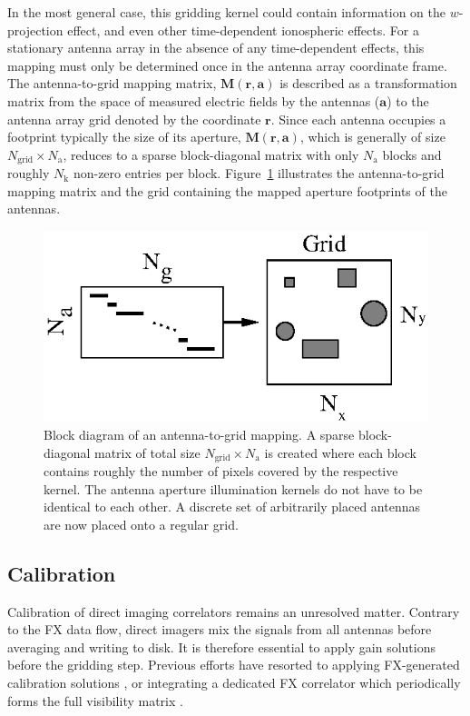 \documentclass[a4paper,fleqn,usenatbib]{../mnras}
\begin{document}
In the most general case, this gridding kernel could contain information on the
$w$-projection effect, and even other time-dependent ionospheric effects. For a
stationary antenna array in the absence of any time-dependent effects, this
mapping must only be determined once in the antenna array coordinate frame. The
antenna-to-grid mapping matrix, $\mathbf{M}(\mathbf{r},\mathbf{a})$ is described
as a transformation matrix from the space of measured electric fields by the antennas
($\mathbf{a}$) to the antenna array grid denoted by the coordinate $\mathbf{r}$. Since each
antenna occupies a footprint typically the size of its aperture,
$\mathbf{M}(\mathbf{r},\mathbf{a})$, which is generally of size
$N_\textrm{grid}\times N_\textrm{a}$, reduces to a sparse block-diagonal matrix
with only $N_\textrm{a}$ blocks and roughly $N_\textrm{k}$ non-zero entries per
block. Figure~\ref{fig:a2g-mapping} illustrates the antenna-to-grid mapping
matrix and the grid containing the mapped aperture footprints of the antennas.

\begin{figure}
  \includegraphics[width=\columnwidth]{a2g_mapping.eps}
  \caption{Block diagram of an antenna-to-grid mapping. A sparse block-diagonal
    matrix of total size $N_\textrm{grid}\times N_\textrm{a}$ is created where each
    block contains roughly the number of pixels covered by the respective kernel.
    The antenna aperture illumination kernels do not have to be identical to each
    other. A discrete set of arbitrarily placed antennas are now placed onto a
    regular grid.}
  \label{fig:a2g-mapping}
\end{figure}

\subsection{Calibration}
Calibration of direct imaging correlators remains an unresolved matter. Contrary
to the FX data flow, direct imagers mix the signals from all antennas before
averaging and writing to disk. It is therefore essential to apply gain solutions 
before the gridding step. Previous efforts have resorted to applying FX-generated
calibration solutions \citep{zhe14, fos14}, or integrating a dedicated FX correlator 
which periodically forms the full visibility matrix \citep{wij09, dev09}. 
\end{document}
